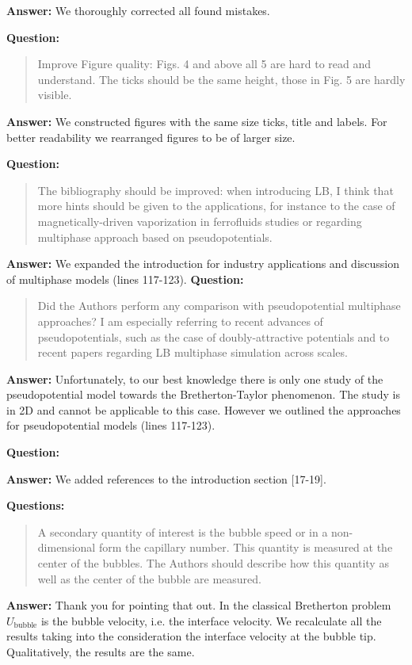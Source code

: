 \documentclass{article}
\begin{document}
\textbf{Answer:} We thoroughly corrected all found mistakes.

\textbf{Question:} 
\begin{quotation}
Improve Figure quality: Figs. 4 and above all 5 are hard to read and understand. The ticks should
be the same height, those in Fig. 5 are hardly visible.
\end{quotation}

\textbf{Answer:} We constructed figures with the same size ticks, title and labels. For better
readability we rearranged figures to be of larger size.

\textbf{Question:} 
\begin{quotation}
The bibliography should be improved: when introducing LB, I think that more hints should be given
to the applications, for instance to the case of magnetically-driven vaporization in ferrofluids
studies or regarding multiphase approach based on pseudopotentials.
\end{quotation}

\textbf{Answer:} We expanded the introduction for industry applications and discussion of
multiphase models (lines 117-123).
\textbf{Question:}
\begin{quotation}
Did the Authors perform any comparison with pseudopotential multiphase approaches? I am
especially referring to recent advances of pseudopotentials, such as the case of doubly-attractive
potentials and to recent papers regarding LB multiphase simulation across scales.
\end{quotation}

\textbf{Answer:} Unfortunately, to our best knowledge there is only one study of the pseudopotential
model towards the Bretherton-Taylor phenomenon. The study is in 2D and cannot be applicable to this
case. However we outlined the approaches for pseudopotential models (lines 117-123).

\textbf{Question:}

\textbf{Answer:} We added references to the introduction section [17-19].

\textbf{Questions:} 
\begin{quotation}
A secondary quantity of interest is the bubble speed or in a non-dimensional
form the capillary
number. This quantity is measured at the center of the bubbles. The Authors should describe how
this quantity as well as the center of the bubble are measured.
\end{quotation}

\textbf{Answer:} Thank you for pointing that out. In the classical Bretherton problem
$U_{\mathrm{bubble}}$ is the bubble velocity, i.e. the interface velocity. We recalculate all the
results taking into the consideration the interface velocity at the bubble tip. Qualitatively, the
results are the same. 
\end{document}
